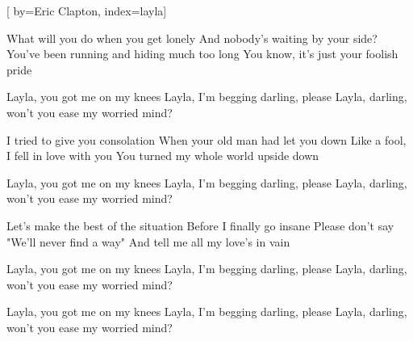 

[%
    by={Eric Clapton},
    index={layla}]


    \label{layla}

    \beginverse
        What will you do when you get lonely
        And nobody's waiting by your side?
        You've been running and hiding much too long
        You know, it's just your foolish pride
    \endverse

    \beginchorus
        Layla, you got me on my knees
        Layla, I'm begging darling, please
        Layla, darling, won't you ease my worried mind?
    \endchorus

    \beginverse
        I tried to give you consolation
        When your old man had let you down
        Like a fool, I fell in love with you
        You turned my whole world upside down
    \endverse

    \beginchorus
        Layla, you got me on my knees
        Layla, I'm begging darling, please
        Layla, darling, won't you ease my worried mind?
    \endchorus

    \beginverse
        Let's make the best of the situation
        Before I finally go insane
        Please don't say "We'll never find a way"
        And tell me all my love's in vain
    \endverse

    \beginchorus
        Layla, you got me on my knees
        Layla, I'm begging darling, please
        Layla, darling, won't you ease my worried mind?
    \endchorus

    \beginchorus
        Layla, you got me on my knees
        Layla, I'm begging darling, please
        Layla, darling, won't you ease my worried mind?
    \endchorus
\endsong
